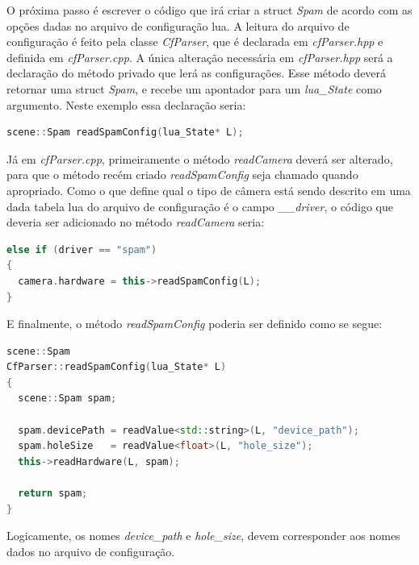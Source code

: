 \documentclass[a4paper,10pt]{article}
\begin{document}
O próxima passo é escrever o código que irá criar a struct \emph{Spam} de
acordo com as opções dadas no arquivo de configuração lua. A leitura do
arquivo de configuração é feito pela classe \emph{CfParser}, que é declarada
em \emph{cfParser.hpp} e definida em \emph{cfParser.cpp}. A única alteração
necessária em \emph{cfParser.hpp} será a declaração do método privado que lerá
as configurações. Esse método deverá retornar uma struct \emph{Spam}, e recebe
um apontador para um \emph{lua\_State} como argumento. Neste exemplo essa
declaração seria:
\begin{lstlisting}[frame=lines,language=c++]
scene::Spam readSpamConfig(lua_State* L);
\end{lstlisting}
Já em \emph{cfParser.cpp}, primeiramente o método \emph{readCamera} deverá ser
alterado, para que o método recém criado \emph{readSpamConfig} seja chamado
quando apropriado. Como o que define qual o tipo de câmera está sendo descrito
em uma dada tabela lua do arquivo de configuração é o campo \emph{\_\_driver}, o
código que deveria ser adicionado no método \emph{readCamera} seria:
\begin{lstlisting}[frame=lines,language=c++]
else if (driver == "spam")
{
  camera.hardware = this->readSpamConfig(L);
}
\end{lstlisting}
E finalmente, o método \emph{readSpamConfig} poderia ser definido como se segue:
\begin{lstlisting}[frame=lines,language=c++]
scene::Spam
CfParser::readSpamConfig(lua_State* L)
{
  scene::Spam spam;

  spam.devicePath = readValue<std::string>(L, "device_path");
  spam.holeSize   = readValue<float>(L, "hole_size");
  this->readHardware(L, spam);

  return spam;
}
\end{lstlisting}
Logicamente, os nomes \emph{device\_path} e \emph{hole\_size}, devem
corresponder aos nomes dados no arquivo de configuração.
\end{document}
